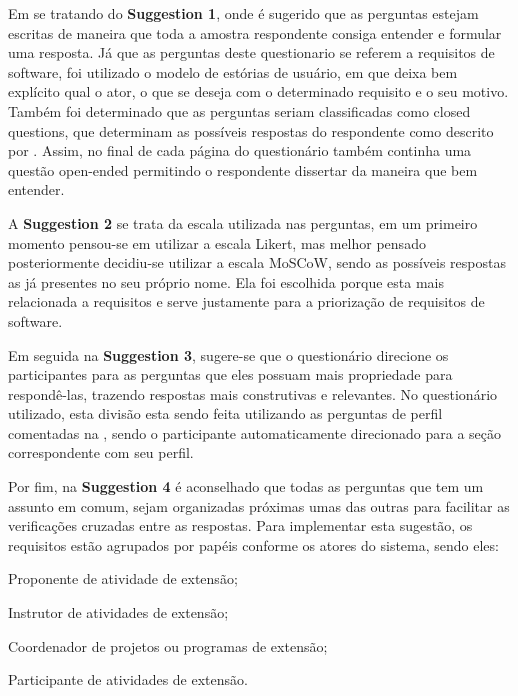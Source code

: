 Em se tratando do \textbf{Suggestion 1}, onde é sugerido que as perguntas estejam escritas de maneira que toda a amostra respondente consiga entender e formular uma resposta. 
Já que as perguntas deste questionario se referem a requisitos de software, foi utilizado o modelo de estórias de usuário, em que deixa bem explícito qual o ator, o que se deseja com o determinado requisito e o seu motivo. 
Também foi determinado que as perguntas seriam classificadas como closed questions, que determinam as possíveis respostas do respondente como descrito por . 
Assim, no final de cada página do questionário também continha uma questão open-ended permitindo o respondente dissertar da maneira que bem entender.

A \textbf{Suggestion 2} se trata da escala utilizada nas perguntas, em um primeiro momento pensou-se em utilizar a escala Likert, mas melhor pensado posteriormente decidiu-se utilizar a escala \ac{MoSCoW}, sendo as possíveis respostas as já presentes no seu próprio nome. 
Ela foi escolhida porque esta mais relacionada a requisitos e serve justamente para a priorização de requisitos de software.

Em seguida na \textbf{Suggestion 3}, sugere-se que o questionário direcione os participantes para as perguntas que eles possuam mais propriedade para respondê-las, trazendo respostas mais construtivas e relevantes. 
No questionário utilizado, esta divisão esta sendo feita utilizando as perguntas de perfil comentadas na , sendo o participante automaticamente direcionado para a seção correspondente com seu perfil.

Por fim, na \textbf{Suggestion 4} é aconselhado que todas as perguntas que tem um assunto em comum, sejam organizadas próximas umas das outras para facilitar as verificações cruzadas entre as respostas. 
Para implementar esta sugestão, os requisitos estão agrupados por papéis conforme os atores do sistema, sendo eles: 
\begin{inparaenum}[(1)]
    \item Proponente de atividade de extensão;
    \item Instrutor de atividades de extensão;
    \item Coordenador de projetos ou programas de extensão;
    \item Participante de atividades de extensão.
\end{inparaenum}
